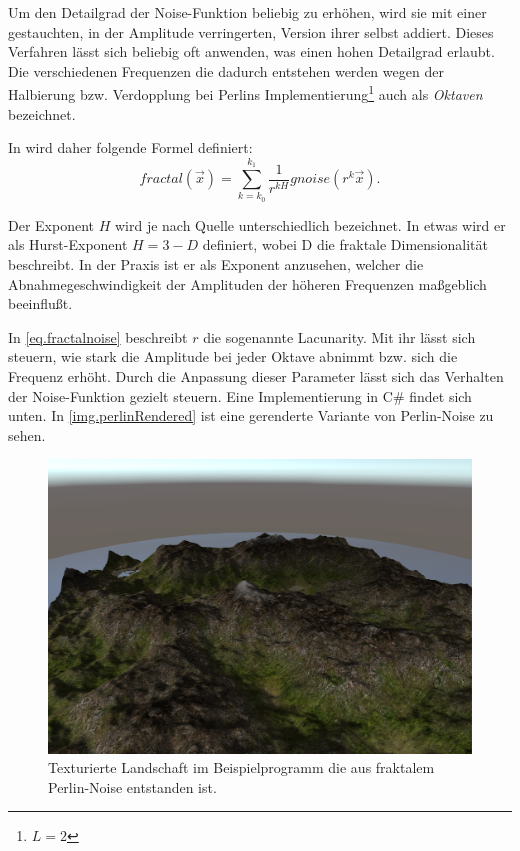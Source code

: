 Um den Detailgrad der Noise-Funktion beliebig zu erhöhen, wird sie mit einer gestauchten, in der Amplitude verringerten, Version ihrer selbst addiert. 
Dieses Verfahren lässt sich beliebig oft anwenden, was einen hohen Detailgrad erlaubt.
Die verschiedenen Frequenzen die dadurch entstehen werden wegen der Halbierung bzw. Verdopplung bei Perlins Implementierung\footnote{$L=2$} auch als \emph{Oktaven} bezeichnet.

In \cite{Saupe} wird daher folgende Formel definiert:
\begin{equation} \label{eq.fractalnoise}
	fractal(\vec{x}) = \sum_{k=k_0}^{k_1}\frac{1}{r^{kH}}gnoise(r^k\vec{x}).
\end{equation}

Der Exponent $H$ wird je nach Quelle unterschiedlich bezeichnet. In \cite{tuMuenchen} etwas wird er als Hurst-Exponent $H=3-D$ definiert, wobei D die fraktale Dimensionalität beschreibt. In der Praxis ist er als Exponent anzusehen, welcher die Abnahmegeschwindigkeit der Amplituden der höheren Frequenzen maßgeblich beeinflußt.

In \autoref{eq.fractalnoise} beschreibt $r$ die sogenannte Lacunarity. Mit ihr lässt sich steuern, wie stark die Amplitude bei jeder Oktave abnimmt bzw. sich die Frequenz erhöht.
Durch die Anpassung dieser Parameter lässt sich das Verhalten der Noise-Funktion gezielt steuern. Eine Implementierung in C\# findet sich unten. In \autoref{img.perlinRendered} ist eine gerenderte Variante von Perlin-Noise zu sehen.

\newpage

\begin{figure}[!hb]%
\centering
\includegraphics[width=\textwidth]{images/perlin_rendered.png}
\caption{Texturierte Landschaft im Beispielprogramm die aus fraktalem Perlin-Noise entstanden ist.}\label{img.perlinRendered}
\end{figure}

